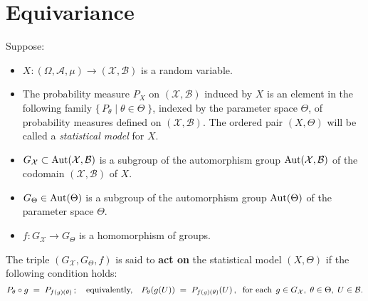 
\newcommand{\Aut}{\textnormal{Aut}}

\section{Equivariance}
\setcounter{theorem}{0}

\begin{definition}\quad
Suppose:
\begin{itemize}
	\item $X : (\Omega,\mathcal{A},\mu) \longrightarrow (\mathcal{X},\mathcal{B})$ is a random variable.
	\item The probability measure $P_{X}$ on $(\mathcal{X},\mathcal{B})$ induced by $X$ is an element
	      in the following family $\{\,P_{\theta}\;\vert\;\theta\in\Theta\;\}$, indexed by the parameter space
	      $\Theta$, of probability measures defined on $(\mathcal{X},\mathcal{B})$.
	      The ordered pair $(X,\Theta)$ will be called a \textit{statistical model} for $X$.

	\item $G_{\mathcal{X}} \subset \Aut(\mathcal{X},\mathcal{B})$ is a subgroup of the automorphism group
	      $\Aut(\mathcal{X},\mathcal{B})$ of the codomain $(\mathcal{X},\mathcal{B})$ of $X$.

	\item $G_{\Theta} \in \Aut(\Theta)$ is a subgroup of the automorphism group $\Aut(\Theta)$ of the
	      parameter space $\Theta$.

	\item $f:G_{\mathcal{X}} \longrightarrow G_{\Theta}$ is a homomorphism of groups.
\end{itemize}
The triple $(G_{\mathcal{X}}, G_{\Theta}, f)$ is said to \textbf{act on} the statistical model
$\left(X,\Theta\right)$ if the following condition holds:
\begin{equation*}
P_{\theta}\circ g \; = \; P_{f(g)(\theta)}
\,;\quad\textnormal{equivalently,}\quad
P_{\theta}\!\left(g(U)\right) \; = \; P_{f(g)(\theta)}\!\left(U\right),
\;\;\textnormal{for each}\;\, g \in G_{\mathcal{X}},\; \theta \in \Theta,\; U \in \mathcal{B}.
\end{equation*}
\end{definition}
